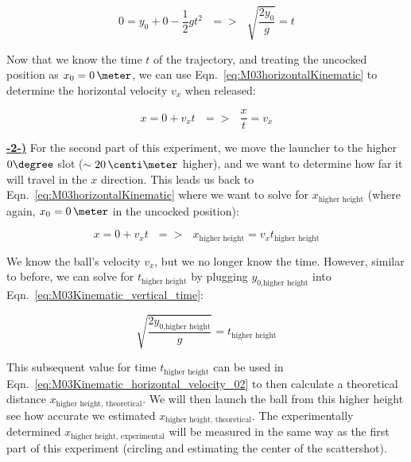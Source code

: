  \begin{equation}
  \label{eq:M03Kinematic_vertical_time}
  0 = y_{0} + 0 - \frac{1}{2}gt^{2}~~~=>~~~\sqrt{\frac{2y_{0}}{g}} = t
\end{equation}

Now that we know the time $t$ of the trajectory, and treating the uncocked position as $x_{0} = 0\,\meter$, we can use Eqn.~\ref{eq:M03horizontalKinematic} to determine the horizontal velocity $v_{x}$ when released:

 \begin{equation}
  \label{eq:M03Kinematic_horizontal_velocity_01}
  x = 0 + v_{x}t~~~=>~~~\frac{x}{t} = v_{x}
\end{equation}

\underline{\textbf{-2-)}} For the second part of this experiment, we move the launcher to the higher $0\degree$ slot ($\sim20\,\centi\meter$ higher), and we want to determine how far it will travel in the $x$ direction. This leads us back to Eqn.~\ref{eq:M03horizontalKinematic} where we want to solve for $x_{\text{higher height}}$ (where again, $x_{0} = 0\,\meter$ in the uncocked position):

 \begin{equation}
  \label{eq:M03Kinematic_horizontal_velocity_02}
  x = 0 + v_{x}t~~~=>~~~x_{\text{higher height}} = v_{x}t_{\text{higher height}}
\end{equation}

We know the ball's velocity $v_{x}$, but we no longer know the time. However, similar to before, we can solve for $t_{\text{higher height}}$ by plugging $y_{0\text{,higher height}}$ into Eqn.~\ref{eq:M03Kinematic_vertical_time}:

 \begin{equation}
  \label{eq:M03Kinematic_vertical_time_higher_height}
  \sqrt{\frac{2y_{0\text{,higher height}}}{g}} = t_{\text{higher height}}
\end{equation}

This subsequent value for time $t_{\text{higher height}}$ can be used in Eqn.~\ref{eq:M03Kinematic_horizontal_velocity_02} to then calculate a theoretical distance $x_{\text{higher height, theoretical}}$. We will then launch the ball from this higher height see how accurate we estimated $x_{\text{higher height, theoretical}}$. The experimentally determined $x_{\text{higher height, experimental}}$ will be measured in the same way as the first part of this experiment (circling and estimating the center of the scattershot).




